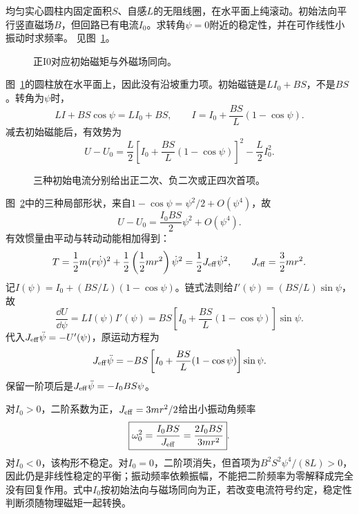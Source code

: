 \begin{exercise}[无阻滚柱的非零初始电流]\label{ex:i1-h11}
均匀实心圆柱内固定面积$S$、自感$L$的无阻线圈，在水平面上纯滚动。初始法向平行竖直磁场$B$，但回路已有电流$I_0$。求转角$\psi=0$附近的稳定性，并在可作线性小振动时求频率。 见图~\ref{fig:i1-h11-q}。
\end{exercise}

\begin{figure}[H]\centering
{}
\caption{正I0对应初始磁矩与外磁场同向。}\label{fig:i1-h11-q}
\end{figure}
\begin{solution}
图~\ref{fig:i1-h11-q}的圆柱放在水平面上，因此没有沿坡重力项。初始磁链是$LI_0+BS$，不是$BS$。转角为$\psi$时，
\[LI+BS\cos\psi=LI_0+BS,\qquad
I=I_0+\frac{BS}{L}(1-\cos\psi).
\]
减去初始磁能后，有效势为
\[U-U_0=\frac L2\left[I_0+\frac{BS}{L}(1-\cos\psi)\right]^2-\frac L2I_0^2.
\]

\begin{figure}[H]\centering
{}
\caption{三种初始电流分别给出正二次、负二次或正四次首项。}\label{fig:i1-h11-s}
\end{figure}

图~\ref{fig:i1-h11-s}中的三种局部形状，来自$1-\cos\psi=\psi^2/2+O(\psi^4)$，故
\[U-U_0=\frac{I_0BS}{2}\psi^2+O(\psi^4).
\]
有效惯量由平动与转动动能相加得到：
\[
T=\frac12m(r\dot\psi)^2+\frac12\left(\frac12mr^2\right)\dot\psi^2
=\frac12J_{\rm eff}\dot\psi^2,\qquad J_{\rm eff}=\frac32mr^2.
\]
记$I(\psi)=I_0+(BS/L)(1-\cos\psi)$。链式法则给$I'(\psi)=(BS/L)\sin\psi$，故
\[\frac{\dd U}{\dd\psi}=LI(\psi)I'(\psi)
=BS\left[I_0+\frac{BS}{L}(1-\cos\psi)\right]\sin\psi.\]
代入$J_{\rm eff}\ddot\psi=-U'(\psi)$，原运动方程为
\[
J_{\rm eff}\ddot\psi
=-BS\left[I_0+\frac{BS}{L}(1-\cos\psi)\right]\sin\psi.
\]
保留一阶项后是$J_{\rm eff}\ddot\psi=-I_0BS\psi$。

对$I_0>0$，二阶系数为正，$J_{\rm eff}=3mr^2/2$给出小振动角频率
\[\boxed{\omega_0^2=\frac{I_0BS}{J_{\rm eff}}=\frac{2I_0BS}{3mr^2}}.
\]
对$I_0<0$，该构形不稳定。对$I_0=0$，二阶项消失，但首项为$B^2S^2\psi^4/(8L)>0$，因此仍是非线性稳定的平衡；振动频率依赖振幅，不能把二阶频率为零解释成完全没有回复作用。式中$I_0$按初始法向与磁场同向为正，若改变电流符号约定，稳定性判断须随物理磁矩一起转换。
\end{solution}

